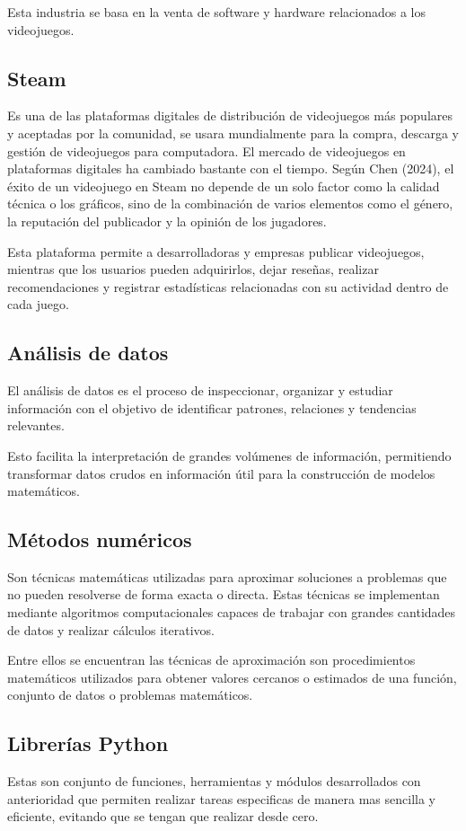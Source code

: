 \documentclass[12pt]{report}
\begin{document}
Esta industria se basa en la venta de software y hardware relacionados a los videojuegos.

\subsection*{Steam}
Es una de las plataformas digitales de distribución de videojuegos más populares y aceptadas por la comunidad, se usara mundialmente para la compra, descarga y gestión de videojuegos para computadora. El mercado de videojuegos en plataformas digitales ha cambiado bastante con el tiempo. Según Chen (2024)\cite{chen2024analysis}, el éxito de un videojuego en Steam no depende de un solo factor como la calidad técnica o los gráficos, sino de la combinación de varios elementos como el género, la reputación del publicador y la opinión de los jugadores.

Esta plataforma permite a desarrolladoras y empresas publicar videojuegos, mientras que los usuarios pueden adquirirlos, dejar reseñas, realizar recomendaciones y registrar estadísticas relacionadas con su actividad dentro de cada juego.

\subsection*{Análisis de datos}
El análisis de datos es el proceso de inspeccionar, organizar y estudiar información con el objetivo de identificar patrones, relaciones y tendencias relevantes.

Esto facilita la interpretación de grandes volúmenes de información, permitiendo transformar datos crudos en información útil para la construcción de modelos matemáticos.

\subsection*{Métodos numéricos}
Son técnicas matemáticas utilizadas para aproximar soluciones a problemas que no pueden resolverse de forma exacta o directa. Estas técnicas se implementan mediante algoritmos computacionales capaces de trabajar con grandes cantidades de datos y realizar cálculos iterativos.

Entre ellos se encuentran las técnicas de aproximación son procedimientos matemáticos utilizados para obtener valores cercanos o estimados de una función, conjunto de datos o problemas matemáticos.

\subsection*{Librerías Python}
Estas son conjunto de funciones, herramientas y módulos desarrollados con anterioridad que permiten realizar tareas especificas de manera mas sencilla y eficiente, evitando que se tengan que realizar desde cero.
\end{document}
